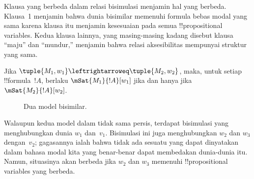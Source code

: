 \documentclass[../../../include/open-logic-section]{subfiles}
\begin{document}
Klausa yang berbeda dalam relasi bisimulasi menjamin hal yang berbeda.
Klausa~1 menjamin bahwa dunia bisimilar memenuhi formula bebas modal yang
sama karena klausa itu menjamin kesesuaian pada semua !!{propositional
variable}s. Kedua klausa lainnya, yang masing-masing kadang disebut klausa
``maju'' dan ``mundur,'' menjamin bahwa relasi aksesibilitas mempunyai
struktur yang sama.

\begin{thm}
Jika $\tuple{M_1,w_1}\leftrightarroweq\tuple{M_2,w_2}$, maka, untuk setiap
!!{formula}~$!A$, berlaku $\mSat{M_1}{!A}[w_1]$ jika dan hanya jika
$\mSat{M_2}{!A}[w_2]$.
\end{thm}

\begin{figure}
  \begin{center}
  \end{center}
  \caption{Dua model bisimilar.}
\end{figure}

Walaupun kedua model dalam  tidak sama persis, terdapat
bisimulasi yang menghubungkan dunia $w_1$ dan~$v_1$. Bisimulasi ini juga
menghubungkan $w_2$ dan $w_3$ dengan~$v_2$; gagasannya ialah bahwa tidak ada
sesuatu yang dapat dinyatakan dalam bahasa modal kita yang benar-benar dapat
membedakan dunia-dunia itu. Namun, situasinya akan berbeda jika $w_2$ dan
$w_3$ memenuhi !!{propositional variable}s yang berbeda.
\end{document}
